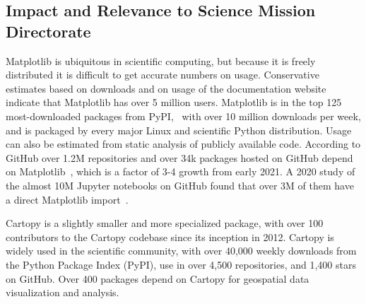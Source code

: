 \documentclass[12pt]{article}
\numberwithin{page}{section}
\begin{document}


%
%
%





\subsection{Impact and Relevance to Science Mission Directorate}

Matplotlib is ubiquitous in scientific computing, but because it is freely
distributed it is difficult to get accurate numbers on usage.  Conservative
estimates based on downloads and on usage of the documentation website indicate
that Matplotlib has over 5 million users.  Matplotlib is in the top 125
most-downloaded packages from PyPI,~\cite{pypi_stats} with over 10 million
downloads per week, and is packaged by every major Linux and scientific Python
distribution.  Usage can also be estimated from static analysis of publicly
available code.  According to GitHub over 1.2M repositories and over 34k
packages hosted on GitHub depend on Matplotlib~\cite{gh_deps:2024},  which is a
factor of 3-4 growth from early 2021. A 2020 study of the almost 10M Jupyter
notebooks on GitHub found that over 3M of them have a direct Matplotlib
import~\cite{datalore:2020}.

Cartopy is a slightly smaller and more specialized package, with over 100 contributors
to the Cartopy codebase since its inception in 2012. Cartopy is widely used in the
scientific community, with over 40,000 weekly downloads from the Python Package Index (PyPI),
use in over 4,500 repositories, and 1,400 stars on GitHub.
Over 400 packages depend on Cartopy for geospatial data visualization and analysis.
\end{document}
